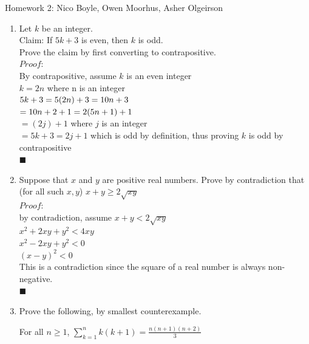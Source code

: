 \documentclass[12pt]{article}
\begin{document}
  
\pagestyle{empty}
 




\vskip0.5in




Homework 2: Nico Boyle, Owen Moorhus, Asher Olgeirson
\begin{enumerate}


\item Let $k$ be an integer. \\
Claim: If $5k+3$ is even, then $k$ is odd. \\
Prove the claim by first converting to contrapositive. \\   %

{\color{blue}
$Proof:$\\
By contrapositive, assume $k$ is an even integer\\
$k=2n$ where n is an integer\\
$5k+3=5(2n)+3\\
=10n+3$\\
$=10n+2+1\\
=2(5n+1)+1$\\
$=(2j)+1$ where $j$ is an integer\\
$=5k+3=2j+1$ which is odd by definition, thus proving $k$ is odd by contrapositive\\
$\blacksquare$
}

\newpage


\item  Suppose that $x$ and $y$ are positive real numbers.
Prove by contradiction that (for all such $x,y$) $x+y \geqslant 2\sqrt{xy}$\\

{\color{blue}
$Proof:$\\
by contradiction, assume $x+y< 2\sqrt{xy}$\\
$x^{2}+2xy+y^{2}<4xy$\\
$x^{2}-2xy+y^{2}<0$\\
$(x-y)^{2}<0$\\
This is a contradiction since the square of a real number is always non-negative.\\
$\blacksquare$
}
\newpage

\item Prove the following, by smallest counterexample. 

For all $n\geqslant 1$, $\sum\limits_{k=1}^n k(k{+}1) = \frac{n(n{+}1)(n{+}2)}{3}$



{\color{blue}


}












\end{enumerate} 
\end{document}
